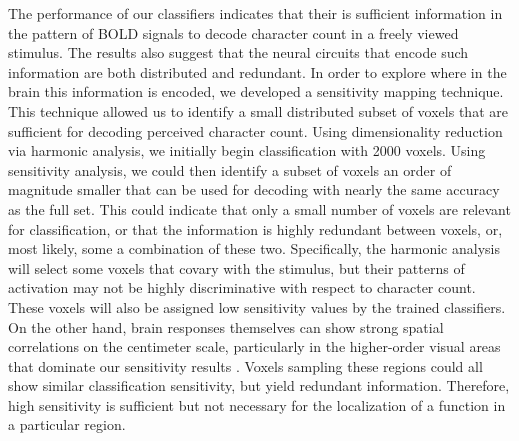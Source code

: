 \documentclass{article}
\begin{document}
The performance of our classifiers indicates that their is sufficient information in the pattern of BOLD signals to decode character count in a freely viewed stimulus. 
The results also suggest that the neural circuits that encode such information are both distributed and redundant.
In order to explore where in the brain this information is encoded, we developed a sensitivity mapping technique.
This technique allowed us to identify a small distributed subset of voxels that are sufficient for decoding perceived character count.
Using dimensionality reduction via harmonic analysis, we initially begin classification with 2000 voxels.
Using sensitivity analysis, we could then identify a subset of voxels an order of magnitude smaller that can be used for decoding with nearly the same accuracy as the full set.
This could indicate that only a small number of voxels are relevant for classification, or that the information is highly redundant between voxels, or, most likely, some a combination of these two.
Specifically, the harmonic analysis will select some voxels that covary with the stimulus, but their patterns of activation may not be highly discriminative with respect to character count.
These voxels will also be assigned low sensitivity values by the trained classifiers.
On the other hand, brain responses themselves can show strong spatial correlations on the centimeter scale, particularly in the higher-order visual areas that dominate our sensitivity results \citep{Engel1997}. 
Voxels sampling these regions could all show similar classification sensitivity, but yield redundant information.
Therefore, high sensitivity is sufficient but not necessary for the localization of a function in a particular region.

\end{document}
